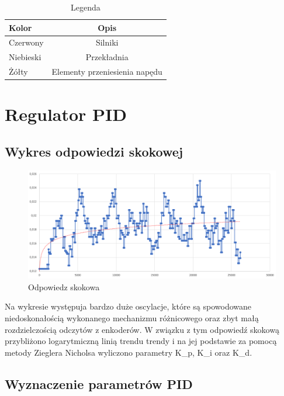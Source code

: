 \documentclass[10pt, a4paper]{article}
\begin{document}
	
		\begin{table}[H]
			\centering
			\begin{tabular}{|l|c|} \hline
				\textbf{Kolor} & \textbf{Opis} \\
				\hline  Czerwony & Silniki  \\\hline
				Niebieski & Przekładnia\\\hline
				Żółty &  Elementy przeniesienia napędu\\
				\hline
			\end{tabular}
			\caption{Legenda}
			\label{tab:Legenda}
		\end{table}

\section{Regulator PID}

\subsection{Wykres odpowiedzi skokowej}
\begin{figure}[H]
		\centering
		\includegraphics[width=1\textwidth]{figures/odp.png}
		\caption{Odpowiedz skokowa}
		\label{fig:Odpowiedz skokowa}
	\end{figure}
	
	Na wykresie występuja bardzo duże oscylacje, które są spowodowane niedoskonałością wykonanego mechanizmu różnicowego oraz zbyt małą rozdzielczością odczytów z enkoderów. W związku z tym odpowiedź skokową przybliżono logarytmiczną linią trendu trendy i na jej podstawie za pomocą metody Zieglera Nicholsa wyliczono parametry K_{p}, K_{i} \hspace{0.1cm} oraz \hspace{0.1cm} K_{d}.
	
\subsection{Wyznaczenie parametrów PID}
\end{document}
